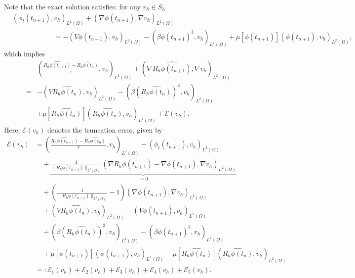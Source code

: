 \documentclass{siamart250211}
\def\nn{\nonumber}
\begin{document}
Note that the exact solution satisfies: for any $v_h \in S_h$
\begin{align*}
	&(\phi_t(t_{n+1}), v_h)_{L^2(\Omega)} + (\nabla \phi(t_{n+1}), \nabla v_h)_{L^2(\Omega)}\\
   & \qquad\qquad\qquad = -(V\phi(t_{n+1}), v_h)_{L^2(\Omega)} - (\beta\phi(t_{n+1})^3,v_h)_{L^2(\Omega)} + \mu[\phi(t_{n+1})](\phi(t_{n+1}),v_h)_{L^2(\Omega)},
\end{align*}
which implies 
\begin{align*}
	&\left( \frac{\widehat{R_h\phi(t_{n+1})} - \widehat{R_h\phi(t_{n})}}{\tau}, v_h    \right)_{L^2(\Omega)} + (\nabla \widehat{R_h\phi(t_{n+1})}, \nabla v_h)_{L^2(\Omega)} \\
	 =& -(V\widehat{R_h\phi(t_{n})}, v_h)_{L^2(\Omega)} - (\beta (\widehat{R_h\phi(t_{n})})^3, v_h)_{L^2(\Omega)} \\
	 & + \mu[\widehat{R_h\phi(t_{n})}] (\widehat{R_h\phi(t_{n})},v_h)_{L^2(\Omega)} + \mathcal{E}(v_h).
\end{align*}
Here, $\mathcal{E}(v_h)$ denotes the truncation error, given by
\begin{align}
	\mathcal{E}(v_h) & = \left( \frac{\widehat{R_h\phi(t_{n+1})} - \widehat{R_h\phi(t_{n})}}{\tau}, v_h    \right)_{L^2(\Omega)} - (\phi_t(t_{n+1}), v_h)_{L^2(\Omega)} \nn \\
	& \quad +  \underbrace{\frac{1}{\|R_h\phi(t_{n+1})\|_{L^2(\Omega)}}(\nabla R_h \phi(t_{n+1}) - \nabla \phi(t_{n+1}), \nabla v_h)_{L^2(\Omega)}}_{=0} \nn \\
	& \quad + \left( \frac{1}{\|R_h\phi(t_{n+1})\|_{L^2(\Omega)}} - 1 \right)(\nabla \phi(t_{n+1}), \nabla v_h)_{L^2(\Omega)} \nn \\
	&\quad + (V\widehat{R_h\phi(t_{n})}, v_h)_{L^2(\Omega)}  - (V\phi(t_{n+1}), v_h)_{L^2(\Omega)} \nn \\
	&\quad + (\beta (\widehat{R_h\phi(t_{n})})^3, v_h)_{L^2(\Omega)} - (\beta \phi(t_{n+1})^3, v_h)_{L^2(\Omega)} \nn \\
	 &\quad + \mu[\phi(t_{n+1})] (\phi(t_{n+1}),v_h)_{L^2(\Omega)} - \mu[\widehat{R_h\phi(t_{n})}] (\widehat{R_h\phi(t_{n})},v_h)_{L^2(\Omega)} \nn \\
	 & =: \mathcal{E}_1(v_h) + \mathcal{E}_2(v_h) + \mathcal{E}_3(v_h) +\mathcal{E}_4(v_h) + \mathcal{E}_5(v_h).
\end{align}
\end{document}
